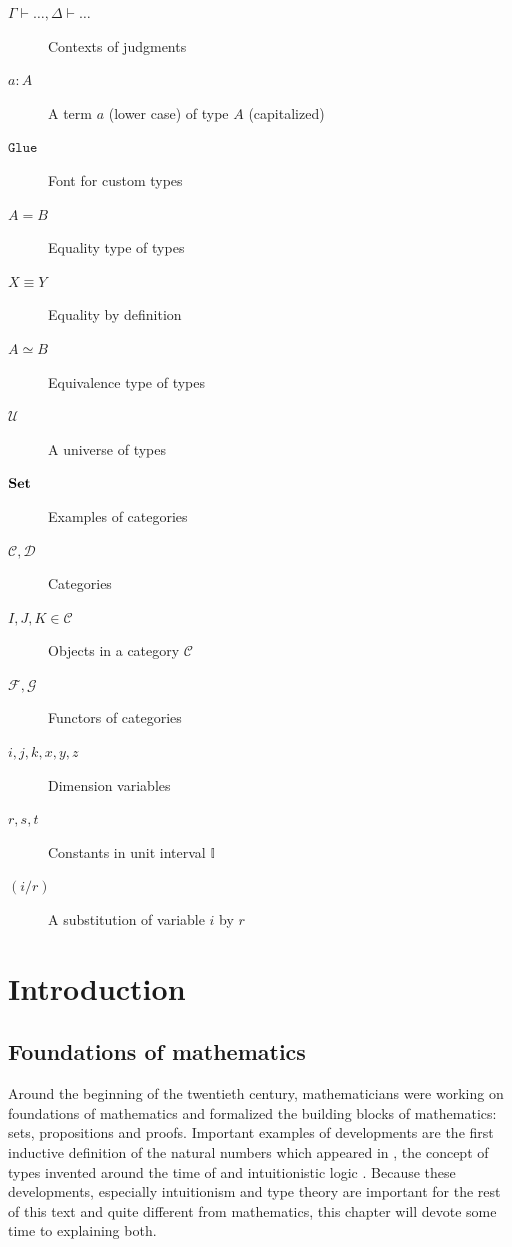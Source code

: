 \documentclass[12pt,a4paper,twoside,xetex]{book} %
\newcommand{\op}[1]{\mathtt{#1}}
\begin{document}
\begin{description}
\item[$\Gamma \vdash \ldots, \Delta \vdash \ldots$] Contexts of judgments
\item[$a : A$] A term $a$ (lower case) of type $A$ (capitalized)
\item[$\op{Glue}$] Font for custom types
\item[$A = B$] Equality type of types
\item[$X \equiv Y$] Equality by definition
\item[$A \simeq B$] Equivalence type of types
\item[$\mathcal{U}$] A universe of types
\item[$\text{\textbf{Set}}$] Examples of categories
\item[$\mathcal{C}, \mathcal{D}$] Categories
\item[$I,J,K \in \mathcal{C}$] Objects in a category $\mathcal{C}$
\item[$\mathcal{F}, \mathcal{G}$] Functors of categories
\item[$i,j,k,x,y,z$] Dimension variables
\item[$r,s,t$] Constants in unit interval $\mathbb{I}$
\item[$(i/r)$] A substitution of variable $i$ by $r$
\end{description}

% 

\tableofcontents


\newpage
\setcounter{page}{0}




\chapter{Introduction}

\section{Foundations of mathematics}\label{types}

Around the beginning of the twentieth century, mathematicians were working on foundations of mathematics and formalized the building blocks of mathematics: sets, propositions and proofs. Important examples of developments are the first inductive definition of the natural numbers which appeared in \cite{Peano1879}, the concept of types invented around the time of \cite{Russel1903} and intuitionistic logic \cite{Heyting1930}. Because these developments, especially intuitionism and type theory are important for the rest of this text and quite different from mathematics, this chapter will devote some time to explaining both.
\end{document}
